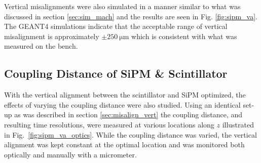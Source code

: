 Vertical misalignments were also simulated in a manner similar to what was discussed in section \ref{sec:sim_mach} and the results are seen in Fig. \ref{fig:sipm_va}.
The GEANT4 simulations indicate that the acceptable range of vertical misalignment is approximately $\pm 250\ \mathrm{\mu m}$ \cite{puneet_sim_talk} which is consistent with what was measured on the bench.

\subsection{Coupling Distance of SiPM \& Scintillator}

With the vertical alignment between the scintillator and SiPM optimized, the effects of varying the coupling distance were also studied.  Using an identical set-up as was described in section \ref{sec:misalign_vert} the coupling distance, and resulting time resolutions, were measured at various locations along $z$ illustrated in Fig.~\ref{fig:sipm_va_optics}.  While the coupling distance was varied, the vertical alignment was kept constant at the optimal location and was monitored both optically and manually with a micrometer.

